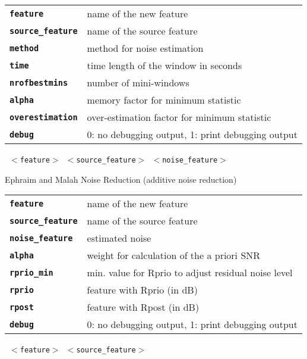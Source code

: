 \begin{description}
\begin{description}
      \begin{tabular}{ll}
 \texttt{\textbf{feature}} &         name of the new feature \\
 \texttt{\textbf{source\_feature}} &  name of the source feature \\
 \texttt{\textbf{method}} &           method for noise estimation  \\
 \texttt{\textbf{time}} &             time length of the window in seconds  \\
 \texttt{\textbf{nrofbestmins}} &     number of mini-windows  \\
 \texttt{\textbf{alpha}} &            memory factor for minimum statistic  \\
 \texttt{\textbf{overestimation}} &   over-estimation factor for minimum statistic  \\
 \texttt{\textbf{debug}} &            0: no debugging output, 1: print debugging output  \\
      \end{tabular}
       \texttt{ $<$feature$>$ $<$source\_feature$>$ $<$noise\_feature$>$     } \

        Ephraim and Malah Noise Reduction (additive noise reduction)

      \begin{tabular}{ll}
 \texttt{\textbf{feature}} &         name of the new feature \\
 \texttt{\textbf{source\_feature}} &  name of the source feature \\
 \texttt{\textbf{noise\_feature}} &   estimated noise \\
 \texttt{\textbf{alpha}} &            weight for calculation of  the a priori SNR  \\
 \texttt{\textbf{rprio\_min}} &        min. value for Rprio to adjust residual noise level  \\
 \texttt{\textbf{rprio}} &            feature with Rprio (in dB) \\
 \texttt{\textbf{rpost}} &            feature with Rpost (in dB) \\
 \texttt{\textbf{debug}} &            0: no debugging output, 1: print debugging output  \\
      \end{tabular}
       \texttt{ $<$feature$>$ $<$source\_feature$>$  } \


\end{description}
\end{description}
